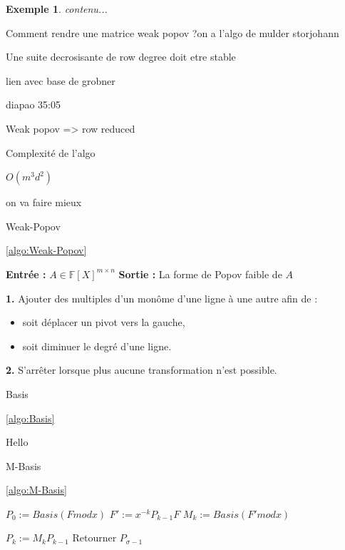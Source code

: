\documentclass[a4paper,12pt]{report}  %
\theoremstyle{definitionstyle}
\theoremstyle{examplestyle}
\newtheorem{example}{Exemple}[chapter] %
\theoremstyle{remarkstyle}
\theoremstyle{propositionstyle}
\theoremstyle{theoremstyle}
\theoremstyle{proofstyle}
\begin{document}
\begin{example}
	contenu...
\end{example}	
	
Comment rendre une matrice weak popov ?on a l'algo de mulder storjohann
	
	
	Une suite decrosisante de row degree doit etre stable
	
	lien avec base de grobner
	
	diapao 35:05
	
	Weak popov => row reduced
	
	Complexité de l'algo
	
	$O(m^3 d^2)$ 
	
	on va faire mieux
\begin{algorithm}
	\caption{Weak-Popov}
	\label{algo:Weak-Popov} 
	\ref{algo:Weak-Popov}
	
	\begin{algorithmic}[1]
		\State \textbf{Entrée :} $A \in \mathbb{F} [X]^{m \times n}$
		\State \textbf{Sortie :} La forme de Popov faible de $A$
		
		\State \textbf{1.} Ajouter des multiples d’un monôme d’une ligne à une autre afin de :
		\begin{itemize}
			\item soit déplacer un pivot vers la gauche,
			\item soit diminuer le degré d’une ligne.
		\end{itemize}
		\State \textbf{2.} S’arrêter lorsque plus aucune transformation n’est possible.
	\end{algorithmic}
\end{algorithm}	
	
\begin{algorithm}
	\caption{Basis}
	\label{algo:Basis} 
	\ref{algo:Basis}
	
	\begin{algorithmic}[1]
		\State Hello
	\end{algorithmic}
\end{algorithm}	
	
	
\begin{algorithm}
	\caption{M-Basis}
	\label{algo:M-Basis} 
	\ref{algo:M-Basis}
	
	\begin{algorithmic}[1]
		\State $P_0 := Basis(F mod x)$
		\State $F' := x^{-k} P_{k-1} F$
		\State $M_k := Basis (F' mod x)$
		
		\State $P_k := M_k P_{k-1}$
		\EndFor
		\State Retourner $P_{\sigma -1}$
	\end{algorithmic}
\end{algorithm}
\end{document}
